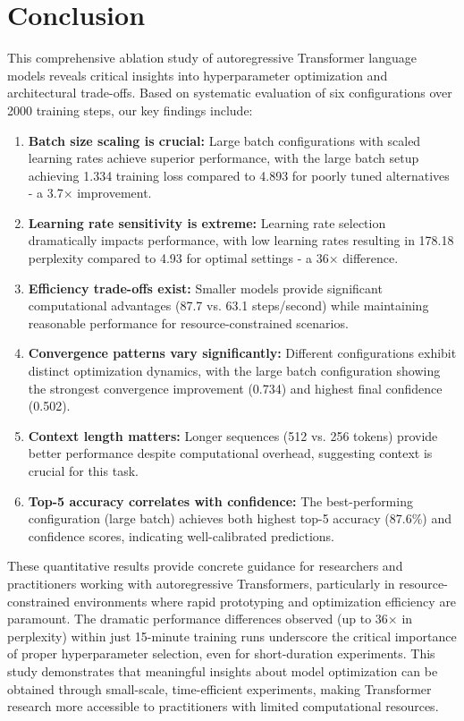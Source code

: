 \documentclass[11pt,a4paper]{article}
\begin{document}
\section{Conclusion}
This comprehensive ablation study of autoregressive Transformer language models reveals critical insights into hyperparameter optimization and architectural trade-offs. Based on systematic evaluation of six configurations over 2000 training steps, our key findings include:

\begin{enumerate}
    \item \textbf{Batch size scaling is crucial:} Large batch configurations with scaled learning rates achieve superior performance, with the large batch setup achieving 1.334 training loss compared to 4.893 for poorly tuned alternatives - a 3.7× improvement.
    
    \item \textbf{Learning rate sensitivity is extreme:} Learning rate selection dramatically impacts performance, with low learning rates resulting in 178.18 perplexity compared to 4.93 for optimal settings - a 36× difference.
    
    \item \textbf{Efficiency trade-offs exist:} Smaller models provide significant computational advantages (87.7 vs. 63.1 steps/second) while maintaining reasonable performance for resource-constrained scenarios.
    
    \item \textbf{Convergence patterns vary significantly:} Different configurations exhibit distinct optimization dynamics, with the large batch configuration showing the strongest convergence improvement (0.734) and highest final confidence (0.502).
    
    \item \textbf{Context length matters:} Longer sequences (512 vs. 256 tokens) provide better performance despite computational overhead, suggesting context is crucial for this task.
    
    \item \textbf{Top-5 accuracy correlates with confidence:} The best-performing configuration (large batch) achieves both highest top-5 accuracy (87.6\%) and confidence scores, indicating well-calibrated predictions.
\end{enumerate}

These quantitative results provide concrete guidance for researchers and practitioners working with autoregressive Transformers, particularly in resource-constrained environments where rapid prototyping and optimization efficiency are paramount. The dramatic performance differences observed (up to 36× in perplexity) within just 15-minute training runs underscore the critical importance of proper hyperparameter selection, even for short-duration experiments. This study demonstrates that meaningful insights about model optimization can be obtained through small-scale, time-efficient experiments, making Transformer research more accessible to practitioners with limited computational resources.
\end{document}
